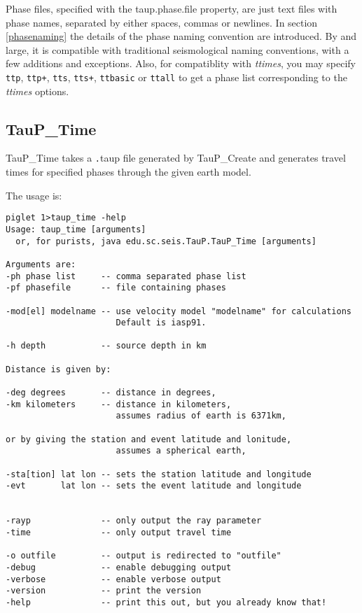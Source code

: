 Phase files, specified with the taup.phase.file property,
 are just text files with phase names, separated by either 
spaces, commas or newlines. In section \ref{phasenaming} the details of 
the phase naming convention are introduced. 
By and large, it is compatible with traditional 
seismological naming conventions, with a few additions and exceptions.
Also, for compatiblity with \textit{ttimes}, you may specify 
\texttt{ttp}, \texttt{ttp+}, \texttt{tts}, \texttt{tts+},
\texttt{ttbasic} or \texttt{ttall} to get a phase list corresponding 
to the \textit{ttimes} options.

\subsection{TauP\_Time}
TauP\_Time takes a {\texttt .taup} file generated by TauP\_Create and generates 
travel times for specified phases through the given earth model. 

The usage is:
\begin{verbatim}
piglet 1>taup_time -help
Usage: taup_time [arguments]
  or, for purists, java edu.sc.seis.TauP.TauP_Time [arguments]

Arguments are:
-ph phase list     -- comma separated phase list
-pf phasefile      -- file containing phases

-mod[el] modelname -- use velocity model "modelname" for calculations
                      Default is iasp91.

-h depth           -- source depth in km

Distance is given by:

-deg degrees       -- distance in degrees,
-km kilometers     -- distance in kilometers,
                      assumes radius of earth is 6371km,

or by giving the station and event latitude and lonitude,
                      assumes a spherical earth,

-sta[tion] lat lon -- sets the station latitude and longitude
-evt       lat lon -- sets the event latitude and longitude


-rayp              -- only output the ray parameter
-time              -- only output travel time

-o outfile         -- output is redirected to "outfile"
-debug             -- enable debugging output
-verbose           -- enable verbose output
-version           -- print the version
-help              -- print this out, but you already know that!
\end{verbatim} 

